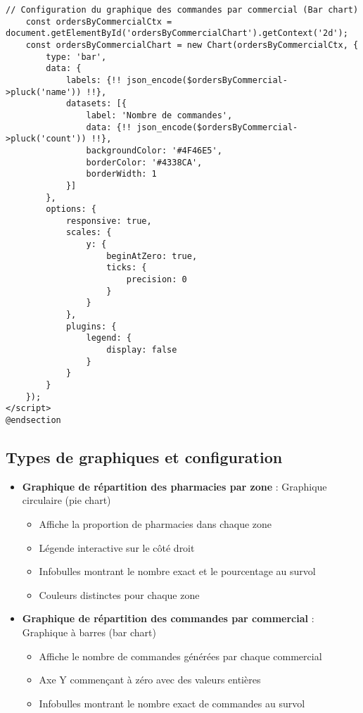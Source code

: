 \documentclass[12pt,a4paper]{article}
\begin{document}
\begin{lstlisting}[caption=Intégration des graphiques avec Chart.js]
    // Configuration du graphique des commandes par commercial (Bar chart)
    const ordersByCommercialCtx = document.getElementById('ordersByCommercialChart').getContext('2d');
    const ordersByCommercialChart = new Chart(ordersByCommercialCtx, {
        type: 'bar',
        data: {
            labels: {!! json_encode($ordersByCommercial->pluck('name')) !!},
            datasets: [{
                label: 'Nombre de commandes',
                data: {!! json_encode($ordersByCommercial->pluck('count')) !!},
                backgroundColor: '#4F46E5',
                borderColor: '#4338CA',
                borderWidth: 1
            }]
        },
        options: {
            responsive: true,
            scales: {
                y: {
                    beginAtZero: true,
                    ticks: {
                        precision: 0
                    }
                }
            },
            plugins: {
                legend: {
                    display: false
                }
            }
        }
    });
</script>
@endsection
\end{lstlisting}

\subsection{Types de graphiques et configuration}
\begin{itemize}
    \item \textbf{Graphique de répartition des pharmacies par zone} : Graphique circulaire (pie chart)
    \begin{itemize}
        \item Affiche la proportion de pharmacies dans chaque zone
        \item Légende interactive sur le côté droit
        \item Infobulles montrant le nombre exact et le pourcentage au survol
        \item Couleurs distinctes pour chaque zone
    \end{itemize}
    \item \textbf{Graphique de répartition des commandes par commercial} : Graphique à barres (bar chart)
    \begin{itemize}
        \item Affiche le nombre de commandes générées par chaque commercial
        \item Axe Y commençant à zéro avec des valeurs entières
        \item Infobulles montrant le nombre exact de commandes au survol
    \end{itemize}
\end{itemize}
\end{document}
